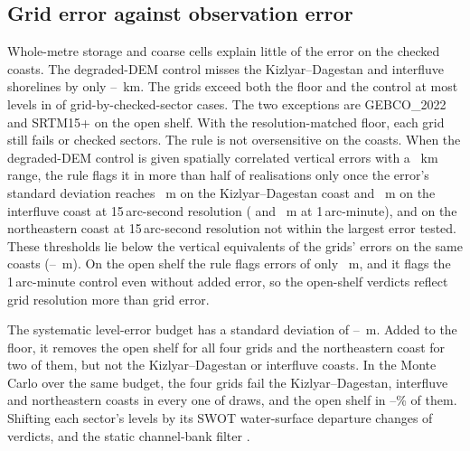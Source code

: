 \subsection{Grid error against observation error}
\label{sec:res_sep}
Whole-metre storage and coarse cells explain little of the error on the checked coasts. The degraded-DEM control misses the Kizlyar--Dagestan and interfluve shorelines by only --~km. The grids exceed both the floor and the control at most levels in  of  grid-by-checked-sector cases. The two exceptions are GEBCO\_2022 and SRTM15+ on the open shelf. With the resolution-matched floor, each grid still fails  or  checked sectors. The rule is not oversensitive on the coasts. When the degraded-DEM control is given spatially correlated vertical errors with a ~km range, the rule flags it in more than half of  realisations only once the error's standard deviation reaches ~m on the Kizlyar--Dagestan coast and ~m on the interfluve coast at 15\,arc-second resolution ( and ~m at 1\,arc-minute), and on the northeastern coast at 15\,arc-second resolution not within the largest error tested. These thresholds lie below the vertical equivalents of the grids' errors on the same coasts (--~m). On the open shelf the rule flags errors of only ~m, and it flags the 1\,arc-minute control even without added error, so the open-shelf verdicts reflect grid resolution more than grid error.

The systematic level-error budget has a standard deviation of --~m. Added to the floor, it removes the open shelf for all four grids and the northeastern coast for two of them, but not the Kizlyar--Dagestan or interfluve coasts. In the Monte Carlo over the same budget, the four grids fail the Kizlyar--Dagestan, interfluve and northeastern coasts in every one of  draws, and the open shelf in --\% of them. Shifting each sector's levels by its SWOT water-surface departure changes  of  verdicts, and the static channel-bank filter .

